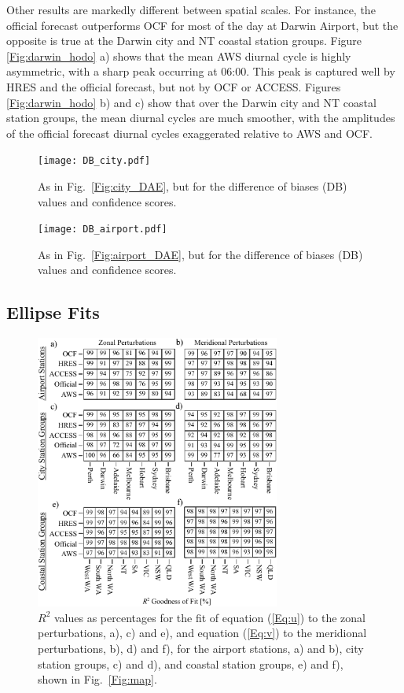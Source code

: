 \documentclass{ametsoc}
\begin{document}
Other results are markedly different between spatial scales. For instance, the official forecast outperforms OCF for most of the day at Darwin Airport, but the opposite is true at the Darwin city and NT coastal station groups. Figure \ref{Fig:darwin_hodo} a) shows that the mean AWS diurnal cycle is highly asymmetric, with a sharp peak occurring at 06:00. This peak is captured well by HRES and the official forecast, but not by OCF or ACCESS. Figures \ref{Fig:darwin_hodo} b) and c) show that over the Darwin city and NT coastal station groups, the mean diurnal cycles are much smoother, with the amplitudes of the official forecast diurnal cycles exaggerated relative to AWS and OCF. 

\begin{figure}
\centering
\texttt{[image: DB\_city.pdf]}
\caption{As in Fig.~\ref{Fig:city_DAE}, but for the difference of biases (DB) values and confidence scores.}
\label{Fig:DB_city}
\end{figure}

\begin{figure}
\centering
\texttt{[image: DB\_airport.pdf]}
\caption{As in Fig.~\ref{Fig:airport_DAE}, but for the difference of biases (DB) values and confidence scores.}
\label{Fig:DB_airport}
\end{figure}

\subsection{Ellipse Fits}

\begin{figure}
\centering
\includegraphics[width=19pc]{r_squared.pdf}
\caption{$R^2$ values as percentages for the fit of equation (\ref{Eq:u}) to the zonal perturbations, a), c) and e), and equation (\ref{Eq:v}) to the meridional perturbations, b), d) and f), for the airport stations, a) and b), city station groups, c) and d), and coastal station groups, e) and f), shown in Fig.~\ref{Fig:map}.}
\label{Fig:r_squared}
\end{figure}
\end{document}
